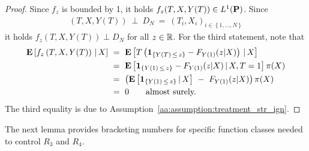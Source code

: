   \begin{proof}
    Since $f_z$ is bounded by 1,
    it holds
    $f_z(T,X,Y(T))\in L^1(\P)$.
    Since
    \begin{gather*}
    (T,X,Y(T))
    \ 
    \perp 
    \ 
    D_N
    \ 
    =
    \ 
    (T_i,X_i)_{i\in \left\{ 1,\ldots,N \right\}}
    \end{gather*}
    it holds
    $f_z(T,X,Y(T))\perp D_N$
    for all $z\in\R$.
    For the third statement, note that
    \begin{align*}
      \E
      \left[
        f_z
        \left( 
          T,
          X,
          Y(T)
        \right)
        \,
        |
        \,
        X
      \right]
      &
      \ 
      =
      \ 
      \E
      \left[
      T
      \left( 
        \mathbf{1}
        _{\left\{  Y(T)\,\le\,z \right\}}
        -
        F_{Y(1)}(z|X)
      \right)
        \,
        |
        \,
        X
      \right]
      \\
      &
      \ 
      =
      \ 
      \E
      \left[
        \mathbf{1}
        _{\left\{  Y(1)\,\le\,z \right\}}
        -
        F_{Y(1)}(z|X)
        \,
        |
        \,
        X
        ,
        T=1
      \right]
      \pi(X)
      \\
      &
      \ 
      =
      \ 
      \left( 
      \E
      \left[
        \mathbf{1}
        _{\left\{  Y(1)\,\le\,z \right\}}
        \,
        |
        \,
        X
      \right]
      \ 
        -
      \ 
        F_{Y(1)}(z|X)
      \right)
      \pi(X)
      \\
      &
      \ 
      =
      \ 
      0
      \qquad
      \text{almost surely.}
    \end{align*}
    The third equality is due to Assumption~\ref{aa:assumption:treatment_str_ign}.
  \end{proof}
The next lemma provides bracketing numbers for specific function classes needed to control $R_3$ and $R_4$.
\newpage
